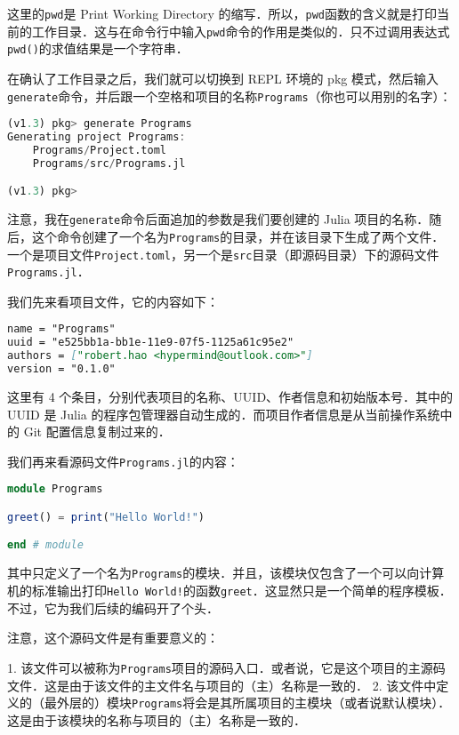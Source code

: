 这里的\verb|pwd|是 Print Working Directory 的缩写．所以，\verb|pwd|函数的含义就是打印当前的工作目录．这与在命令行中输入\verb|pwd|命令的作用是类似的．只不过调用表达式\verb|pwd()|的求值结果是一个字符串．

在确认了工作目录之后，我们就可以切换到 REPL 环境的 pkg 模式，然后输入\verb|generate|命令，并后跟一个空格和项目的名称\verb|Programs|（你也可以用别的名字）：

\begin{lstlisting}[language=julia]
(v1.3) pkg> generate Programs
Generating project Programs:
    Programs/Project.toml
    Programs/src/Programs.jl

(v1.3) pkg> 
\end{lstlisting}

注意，我在\verb|generate|命令后面追加的参数是我们要创建的 Julia 项目的名称．随后，这个命令创建了一个名为\verb|Programs|的目录，并在该目录下生成了两个文件．一个是项目文件\verb|Project.toml|，另一个是\verb|src|目录（即源码目录）下的源码文件\verb|Programs.jl|．

我们先来看项目文件，它的内容如下：

\begin{lstlisting}[language=markdown]
name = "Programs"
uuid = "e525bb1a-bb1e-11e9-07f5-1125a61c95e2"
authors = ["robert.hao <hypermind@outlook.com>"]
version = "0.1.0"
\end{lstlisting}

这里有 4 个条目，分别代表项目的名称、UUID、作者信息和初始版本号．其中的 UUID 是 Julia 的程序包管理器自动生成的．而项目作者信息是从当前操作系统中的 Git 配置信息复制过来的．

我们再来看源码文件\verb|Programs.jl|的内容：

\begin{lstlisting}[language=julia]
module Programs

greet() = print("Hello World!")

end # module
\end{lstlisting}

其中只定义了一个名为\verb|Programs|的模块．并且，该模块仅包含了一个可以向计算机的标准输出打印\verb|Hello World!|的函数\verb|greet|．这显然只是一个简单的程序模板．不过，它为我们后续的编码开了个头．

注意，这个源码文件是有重要意义的：

1. 该文件可以被称为\verb|Programs|项目的源码入口．或者说，它是这个项目的主源码文件．这是由于该文件的主文件名与项目的（主）名称是一致的．
2. 该文件中定义的（最外层的）模块\verb|Programs|将会是其所属项目的主模块（或者说默认模块）．这是由于该模块的名称与项目的（主）名称是一致的．

